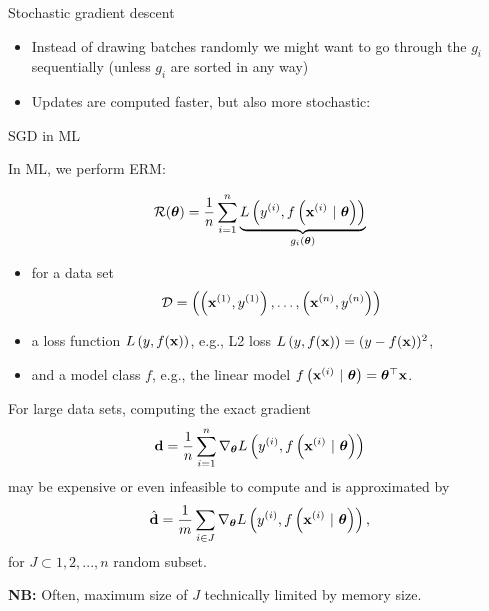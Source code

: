 \documentclass[11pt,compress,t,notes=noshow, xcolor=table]{beamer}
\begin{document}
\begin{vbframe}{Stochastic gradient descent}
\begin{itemize}
    \footnotesize
    \item Instead of drawing batches randomly we might want to go through the $g_i$ sequentially (unless $g_i$ are sorted in any way)
    \item Updates are computed faster, but also more stochastic: 
    \begin{itemize} 
    \end{itemize} 
\end{itemize}

\end{vbframe}

\begin{vbframe}{SGD in ML}

In ML, we perform ERM:  

$$
    \mathcal{R}(\bm{\theta}) = \frac{1}{n}\sum\limits_{i=1}^n \underbrace{L\left(y^{(i)}, f\left(\mathbf{x}^{(i)} ~|~ \bm{\theta}\right)\right)}_{g_i(\bm{\theta})}
$$

\begin{itemize}
    \item for a data set 
    $$\mathcal{D} = \left( \left(\mathbf{x}^{(1)}, y^{(1)}\right), \ldots, \left(\mathbf{x}^{(n)}, y^{(n)}\right)\right)$$
    \item a loss function $L\left(y, f(\mathbf{x})\right)$, e.g., L2 loss $L\left(y, f(\mathbf{x})\right) = (y - f(\mathbf{x}))^2$,
    \item and a model class $f$, e.g., the linear model $f\left(\mathbf{x}^{(i)} ~|~ \bm{\theta}\right) = \bm{\theta}^\top \mathbf{x}$. 
\end{itemize}

\framebreak 

For large data sets, computing the exact gradient 
$$
    \mathbf{d} = \frac{1}{n}\sum_{i=1}^n \nabla_{\thetab} \Lxyit %
$$ 
may be expensive or even infeasible to compute and is approximated by 
$$
\hat{\mathbf{d}} = \frac{1}{m}\sum_{i \in J} \nabla_{\bm{\theta}} L\left(y^{(i)}, f\left(\mathbf{x}^{(i)} ~|~ \bm{\theta}\right)\right),
$$
    for $J \subset{1, 2, ..., n}$ random subset. 

    \lz 
    
\textbf{NB:} Often, maximum size of $J$ technically limited by memory size.
\end{vbframe}
\end{document}
